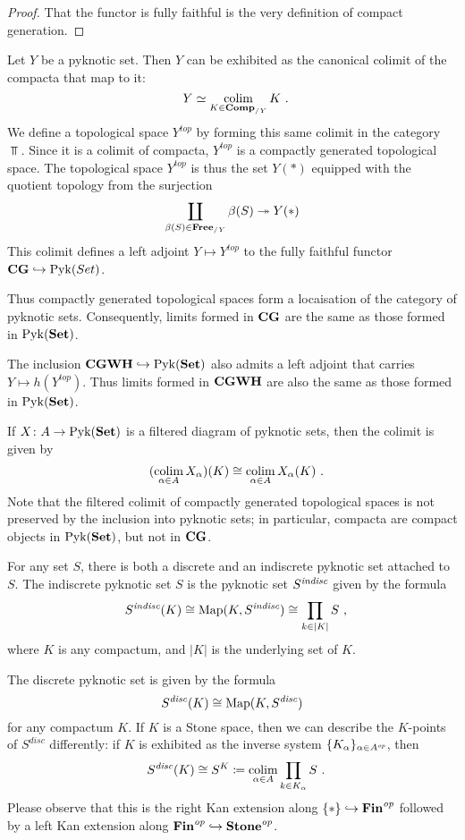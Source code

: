 \begin{proof}
	That the functor is fully faithful is the very definition of compact generation.
\end{proof}

\begin{cnstr}
	Let $ Y $ be a pyknotic set.
	Then $ Y $ can be exhibited as the canonical colimit of the compacta that map to it:
	\[
		Y \simeq \colim_{K \in \Comp_{/Y}} K \period
	\]
	We define a topological space $ Y^{\textit{top}} $ by forming this same colimit in the category $ \Top $.
	Since it is a colimit of compacta, $ Y^{\textit{top}} $ is a compactly generated topological space.
	The topological space $ Y^{\textit{top}} $ is thus the set $ Y(\ast) $ equipped with the quotient topology from the surjection
	\[
		\coprod_{\beta(S) \in \textbf{\textup{Free}}_{/Y}} \beta(S) \twoheadrightarrow Y(\ast)
	\]
	This colimit defines a left adjoint $ Y \mapsto Y^{\textit{top}} $ to the fully faithful functor $ \textbf{\textup{CG}} \hookrightarrow \operatorname{Pyk}(Set) $.

	Thus compactly generated topological spaces form a locaisation of the category of pyknotic sets.
	Consequently, limits formed in $ \textbf{\textup{CG}} $ are the same as those formed in $ \operatorname{Pyk}(\textbf{\textup{Set}}) $.
	
	The inclusion $ \textbf{\textup{CGWH}} \hookrightarrow \operatorname{Pyk}(\textbf{\textup{Set}}) $ also admits a left adjoint that carries $ Y \mapsto h(Y^{\textit{top}}) $.
	Thus limits formed in $ \textbf{\textup{CGWH}} $ are also the same as those formed in $ \operatorname{Pyk}(\textbf{\textup{Set}}) $.
\end{cnstr}

\begin{nul}
	If $ X \colon A \to \operatorname{Pyk}(\textbf{\textup{Set}}) $ is a filtered diagram of pyknotic sets, then the colimit is given by
	\[
		(\colim_{\alpha \in A} X_{\alpha})(K) \cong \colim_{\alpha \in A} X_{\alpha}(K) \period
	\]
	Note that the filtered colimit of compactly generated topological spaces is not preserved by the inclusion into pyknotic sets;
	in particular, compacta are compact objects in $ \operatorname{Pyk}(\textbf{\textup{Set}}) $, but not in $ \textbf{\textup{CG}} $.
\end{nul}

\begin{exm}
	For any set $ S $, there is both a discrete and an indiscrete pyknotic set attached to $ S $.
	The indiscrete pyknotic set $ S $ is the pyknotic set $ S^{\textit{indisc}} $ given by the formula
	\[
		S^{\indisc}(K) \cong \Map(K, S^{\indisc}) \cong \prod_{k \in |K|} S \comma
	\]
	where $ K $ is any compactum, and $ |K| $ is the underlying set of $ K $.

	The discrete pyknotic set is given by the formula
	\[
		S^{\textit{disc}}(K) \cong \operatorname{Map}(K, S^{\textit{disc}})
	\]
	for any compactum $ K $.
	If $ K $ is a Stone space, then we can describe the $ K $-points of $ S^{disc} $ differently: if $ K $ is exhibited as the inverse system $ \{ K_{\alpha} \}_{\alpha \in A^{\textit{op}}} $, then
	\[
		S^{\disc}(K) \cong S^K \coloneq \colim_{\alpha \in A} \prod_{k \in K_{\alpha}} S \period
	\]
	Please observe that this is the right Kan extension along $ \{ \ast \} \hookrightarrow \textbf{\textup{Fin}}^{\textit{op}} $ followed by a left Kan extension along $ \textbf{\textup{Fin}}^{\textit{op}} \hookrightarrow \textbf{\textup{Stone}}^{\textit{op}} $.
\end{exm}

